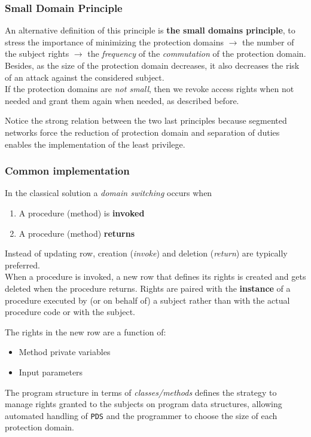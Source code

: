 \subsubsection{Small Domain Principle}
An alternative definition of this principle is \textbf{the small
domains principle}, to stress the importance of minimizing the
protection domains $\longrightarrow$ the number of the subject rights $\longrightarrow$ the
\textit{frequency} of the \textit{commutation} of the protection domain.\\
Besides, as the size of the protection domain decreases, it also
decreases the risk of an attack against the considered
subject.\\
If the protection domains are \textit{not small}, then we revoke access
rights when not needed and grant them again when needed, as described before.

\nl
Notice the strong relation between the two last principles
because segmented networks force the reduction of protection
domain and separation of duties enables the implementation of
the least privilege.

\subsubsection{Common implementation}
In the classical solution a \textit{domain switching} occurs when
\begin{enumerate}
   \item A procedure (method) is \textbf{invoked}
   \item A procedure (method) \textbf{returns}
\end{enumerate}

Instead of updating row, creation (\textit{invoke}) and deletion (\textit{return}) are typically preferred.\\
When a procedure is invoked, a new row that defines its
rights is created and gets deleted when the procedure returns.
Rights are paired with the \textbf{instance} of a procedure executed
by (or on behalf of) a subject rather than with the actual procedure
code or with the subject.

The rights in the new row are a function of:
\begin{itemize}
   \item Method private variables
   \item Input parameters
\end{itemize}
The program structure in terms of \textit{classes/methods} defines the
strategy to manage rights granted to the subjects on
program data structures,
allowing automated handling of \texttt{PDS} and 
the programmer to choose the size of each protection
domain.

